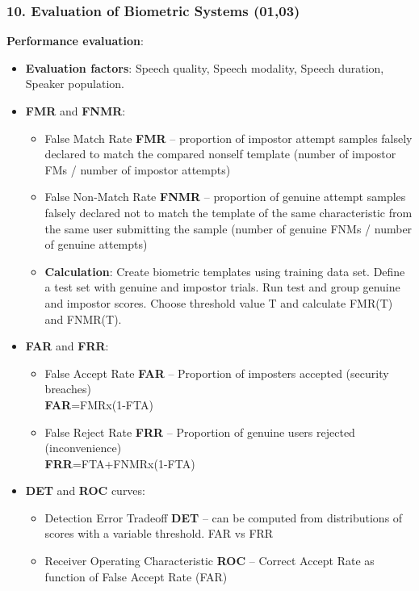 \documentclass[a4paper]{article}
\begin{document}
    \subsubsection*{10. Evaluation of Biometric Systems (01,03)}
      \textbf{Performance evaluation}:
      \begin{itemize}
        \item \textbf{Evaluation factors}: Speech quality, Speech modality, Speech duration, Speaker population.
        \item \textbf{FMR} and \textbf{FNMR}:
        \begin{itemize}
          \item False Match Rate \textbf{FMR} -- proportion of impostor attempt samples falsely declared to match the compared nonself template (number of impostor FMs / number of impostor attempts)
          \item False Non-Match Rate \textbf{FNMR} -- proportion of genuine attempt samples falsely declared not to match the template of the same characteristic from the same user submitting the sample (number of genuine FNMs / number of genuine attempts)
          \item \textbf{Calculation}: Create biometric templates using training data set. Define a test set with genuine and impostor trials. Run test and group genuine and impostor scores. Choose threshold value T and calculate FMR(T) and FNMR(T).
        \end{itemize}
        \item \textbf{FAR} and \textbf{FRR}:
        \begin{itemize}
          \item False Accept Rate \textbf{FAR} -- Proportion of imposters accepted (security breaches)\\\textbf{FAR}=FMRx(1-FTA)
          \item False Reject Rate \textbf{FRR} -- Proportion of genuine users rejected (inconvenience)\\\textbf{FRR}=FTA+FNMRx(1-FTA)
        \end{itemize}
        \item \textbf{DET} and \textbf{ROC} curves:
        \begin{itemize}
          \item Detection Error Tradeoff \textbf{DET} -- can be computed from distributions of scores with a variable threshold. FAR vs FRR
          \item Receiver Operating Characteristic \textbf{ROC} -- Correct Accept Rate as function of False Accept Rate (FAR)

\end{itemize}
\end{itemize}
\end{document}
